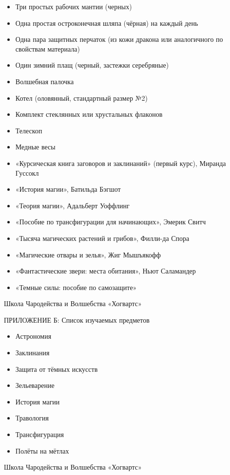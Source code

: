 \documentclass[14pt, a4paper]{article}
\begin{document}
\begin{itemize}
	\item Три простых рабочих мантии (черных)
	\item Одна простая остроконечная шляпа (чёрная) на каждый день
	\item Одна пара защитных перчаток (из кожи дракона или аналогичного по свойствам материала)
	\item Один зимний плащ (черный, застежки серебряные)
	\item Волшебная палочка
	\item Котел (оловянный, стандартный размер №2)
	\item Комплект стеклянных или хрустальных флаконов
	\item Телескоп
	\item Медные весы
	\item «Курсическая книга заговоров и заклинаний» (первый курс), Миранда Гуссокл
	\item «История магии», Батильда Бэгшот
	\item «Теория магии», Адальберт Уоффлинг
	\item «Пособие по трансфигурации для начинающих», Эмерик Свитч
	\item «Тысяча магических растений и грибов», Филли-да Спора
	\item «Магические отвары и зелья», Жиг Мышъякофф
	\item «Фантастические звери: места обитания», Ньют Саламандер
	\item «Темные силы: пособие по самозащите»
	
\end{itemize}

\vfill
\begin{center}
	{\fontsize{12}{1}\selectfont Школа Чародейства и Волшебства «Хогвартс»}
\end{center}



\newpage
{\fontsize{18}{1}\selectfont ПРИЛОЖЕНИЕ Б: Список изучаемых предметов}

\begin{itemize}
	\item Астрономия
	\item Заклинания
	\item Защита от тёмных искусств
	\item Зельеварение
	\item История магии
	\item Травология
	\item Трансфигурация
	\item Полёты на мётлах
\end{itemize}

\vfill
\begin{center}
	{\fontsize{12}{1}\selectfont Школа Чародейства и Волшебства «Хогвартс»}
\end{center}
\end{document}
